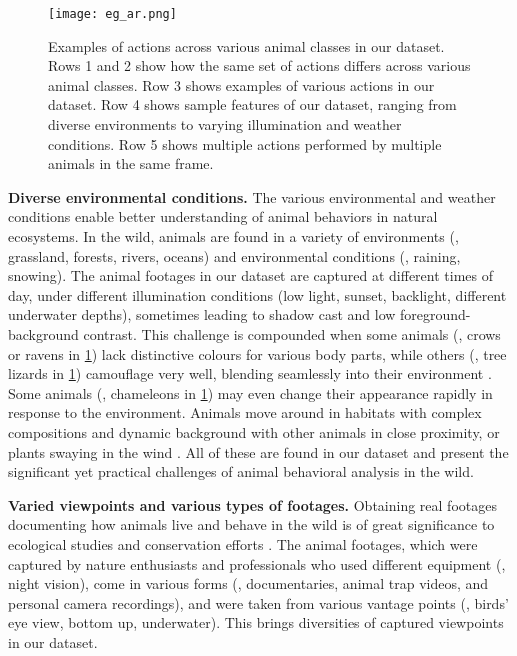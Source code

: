\documentclass[10pt,twocolumn,letterpaper]{article}
\begin{document}
    \begin{figure}[t] 
    
        \centering
        \texttt{[image: eg\_ar.png]}
        \vspace{-0.6cm}
        \caption{Examples of actions across various animal classes in our dataset. Rows 1 and 2 show how the same set of actions differs across various animal classes. Row 3 shows examples of various actions in our dataset. Row 4 shows sample features of our dataset, ranging from diverse environments to varying illumination and weather conditions. Row 5 shows multiple actions performed by multiple animals in the same frame. 
        }
     
        \label{fig:eg_ar}
        \vspace{-0.5cm}
    \end{figure}
    
    \textbf{Diverse environmental conditions.}
    The various environmental and weather conditions enable better understanding of animal behaviors in natural ecosystems. In the wild, animals are found in a variety of environments (\eg, grassland, forests, rivers, oceans) and environmental conditions (\eg, raining, snowing). The animal footages in our dataset are captured at different times of day, under different illumination conditions (\eg low light, sunset, backlight, different underwater depths), sometimes leading to shadow cast and low foreground-background contrast. This challenge is compounded when some animals (\eg, crows or ravens in \cref{fig:eg_ar}) lack distinctive colours for various body parts, while others (\eg, tree lizards in \cref{fig:eg_ar}) camouflage very well, blending seamlessly into their environment \cite{risse2017visual}. Some animals (\eg, chameleons in \cref{fig:eg_ar}) may even change their appearance rapidly in response to the environment. Animals move around in habitats with complex compositions and dynamic background with other animals in close proximity, or plants swaying in the wind \cite{risse2017visual}. All of these are found in our dataset and present the significant yet practical challenges of animal behavioral analysis in the wild. 
    
    
    \textbf{Varied viewpoints and various types of footages.}
    Obtaining real footages documenting how animals live and behave in the wild is of great significance to ecological studies and conservation efforts \cite{singh2020animal}. The animal footages, which were captured by nature enthusiasts and professionals who used different equipment (\eg, night vision), come in various forms (\eg, documentaries, animal trap videos, and personal camera recordings), and were taken from various vantage points (\eg, birds' eye view, bottom up, underwater). This brings diversities of captured viewpoints in our dataset.
    
\end{document}
